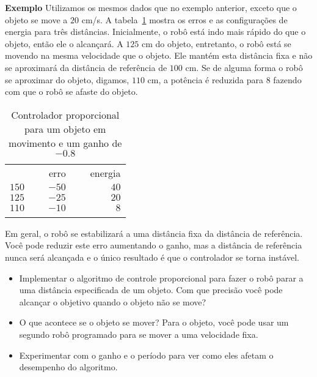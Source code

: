 \smallskip

\noindent\textbf{Exemplo} Utilizamos os mesmos dados que no exemplo anterior, exceto que o objeto se move a $20$ cm/s. A tabela~\ref{tab.p-controller-moving} mostra os erros e as configurações de energia para três distâncias. Inicialmente, o robô está indo mais rápido do que o objeto, então ele o alcançará. A $125$ cm do objeto, entretanto, o robô está se movendo na mesma velocidade que o objeto. Ele mantém esta distância fixa e não se aproximará da distância de referência de $100$ cm. Se de alguma forma o robô se aproximar do objeto, digamos, $110$ cm, a potência é reduzida para $8$ fazendo com que o robô se afaste do objeto.

\begin{table}
\caption{Controlador proporcional para um objeto em movimento e um ganho de $-0.8$}
\label{tab.p-controller-moving}
\begin{tabular}{rrr}
\hline\noalign{\smallskip}
\multicolumn{1}{c}{distância} & \multicolumn{1}{c}{\ \ \ erro}& \multicolumn{1}{c}{\ \ \ energia}\\
\noalign{\smallskip}\hline\noalign{\smallskip}
$150$ & $-50$ & $40$\\
$125$ & $-25$ & $20$\\
$110$ & $-10$ & $8$\\
\noalign{\smallskip}\hline\noalign{\smallskip}
\end{tabular}
\end{table}

Em geral, o robô se estabilizará a uma distância fixa da distância de referência. Você pode reduzir este erro aumentando o ganho, mas a distância de referência nunca será alcançada e o único resultado é que o controlador se torna instável.

\begin{framed}
\begin{itemize}
\item Implementar o algoritmo de controle proporcional para fazer o robô parar a uma distância especificada de um objeto. Com que precisão você pode alcançar o objetivo quando o objeto não se move?
\item O que acontece se o objeto se mover? Para o objeto, você pode usar um segundo robô programado para se mover a uma velocidade fixa.
\item Experimentar com o ganho e o período para ver como eles afetam o desempenho do algoritmo.
\end{itemize}
\end{framed}

